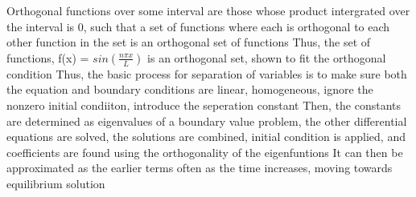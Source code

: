 \documentclass[11 pt, twoside]{article}
\newenvironment{outline*}
{
	\begin{outline}[enumerate]
	}
	{\end{outline}
}
\begin{document}
\begin{outline*}
\1 Orthogonal functions over some interval are those whose product intergrated over the interval is 0, such that a set of functions where each is orthogonal to each other function in the set is an orthogonal set of functions
	\2 Thus, the set of functions, f(x) = $sin(\frac{n\pi x}{L})$ is an orthogonal set, shown to fit the orthogonal condition
\1 Thus, the basic process for separation of variables is to make sure both the equation and boundary conditions are linear, homogeneous, ignore the nonzero initial condiiton, introduce the seperation constant
	\2 Then, the constants are determined as eigenvalues of a boundary value problem, the other differential equations are solved, the solutions are combined, initial condition is applied, and coefficients are found using the orthogonality of the eigenfuntions
	\2 It can then be approximated as the earlier terms often as the time increases, moving towards equilibrium solution
\end{outline*}
\end{document}
